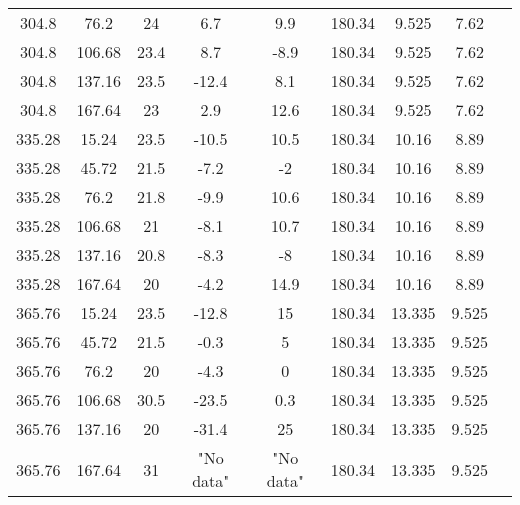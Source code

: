 \begin{landscape}
\begin{center}
\begin{tabular}{| c | c | c | c | c | c | c | c | c |}
304.8 & 76.2 & 24 & 6.7 & 9.9 & 180.34 & 9.525 & 7.62 \\
304.8 & 106.68 & 23.4 & 8.7 & -8.9 & 180.34 & 9.525 & 7.62 \\
304.8 & 137.16 & 23.5 & -12.4 & 8.1 & 180.34 & 9.525 & 7.62 \\
304.8 & 167.64 & 23 & 2.9 & 12.6 & 180.34 & 9.525 & 7.62 \\
335.28 & 15.24 & 23.5 & -10.5 & 10.5 & 180.34 & 10.16 & 8.89 \\
335.28 & 45.72 & 21.5 & -7.2 & -2 & 180.34 & 10.16 & 8.89 \\
335.28 & 76.2 & 21.8 & -9.9 & 10.6 & 180.34 & 10.16 & 8.89 \\
335.28 & 106.68 & 21 & -8.1 & 10.7 & 180.34 & 10.16 & 8.89 \\
335.28 & 137.16 & 20.8 & -8.3 & -8 & 180.34 & 10.16 & 8.89 \\
335.28 & 167.64 & 20 & -4.2 & 14.9 & 180.34 & 10.16 & 8.89 \\
365.76 & 15.24 & 23.5 & -12.8 & 15 & 180.34 & 13.335 & 9.525 \\
365.76 & 45.72 & 21.5 & -0.3 & 5 & 180.34 & 13.335 & 9.525 \\
365.76 & 76.2 & 20 & -4.3 & 0 & 180.34 & 13.335 & 9.525 \\
365.76 & 106.68 & 30.5 & -23.5 & 0.3 & 180.34 & 13.335 & 9.525 \\
365.76 & 137.16 & 20 & -31.4 & 25 & 180.34 & 13.335 & 9.525 \\
365.76 & 167.64 & 31 & "No data" & "No data" & 180.34 & 13.335 & 9.525 \\
\hline
\end{tabular}
\label{tab:iceRoughness}
\end{center}
\end{landscape}